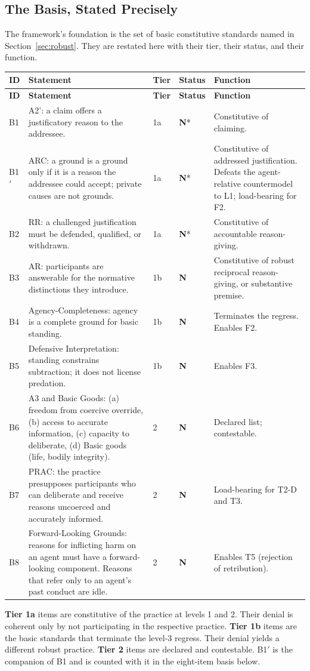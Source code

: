 \documentclass[11pt]{article}
\def\ensuremath#1{#1}%
\def\mathrm#1{#1}%
\def\textsuperscript#1{#1}%
\newcommand{\statusN}{\textcolor{stN}{\textbf{N}}}
\newcommand{\Atwo}{\texorpdfstring{\ensuremath{\mathrm{A2}'}}{A2'}}
\begin{document}
\subsection{The Basis, Stated Precisely}
The framework's foundation is the set of basic constitutive standards named in Section~\ref{sec:robust}. They are restated here with their tier, their status, and their function.
\begin{longtable}{@{}L{1.0cm} L{4.9cm} L{0.9cm} L{1.4cm} L{7.0cm}@{}}
\toprule
\textbf{ID} & \textbf{Statement} & \textbf{Tier} & \textbf{Status} & \textbf{Function} \\
\midrule
\endfirsthead
\toprule
\textbf{ID} & \textbf{Statement} & \textbf{Tier} & \textbf{Status} & \textbf{Function} \\
\midrule
\endhead
\bottomrule
\endfoot
B1 & \Atwo{}: a claim offers a justificatory reason to the addressee. & 1a & \statusN{}\textsuperscript{*} & Constitutive of claiming. \\
B1$'$ & ARC: a ground is a ground only if it is a reason the addressee could accept; private causes are not grounds. & 1a & \statusN{}\textsuperscript{*} & Constitutive of addressed justification. Defeats the agent-relative countermodel to L1; load-bearing for F2. \\
B2 & RR: a challenged justification must be defended, qualified, or withdrawn. & 1a & \statusN{}\textsuperscript{*} & Constitutive of accountable reason-giving. \\
B3 & AR: participants are answerable for the normative distinctions they introduce. & 1b & \statusN{} & Constitutive of robust reciprocal reason-giving, or substantive premise. \\
B4 & Agency-Completeness: agency is a complete ground for basic standing. & 1b & \statusN{} & Terminates the regress. Enables F2. \\
B5 & Defensive Interpretation: standing constrains subtraction; it does not license predation. & 1b & \statusN{} & Enables F3. \\
B6 & A3 and Basic Goods: (a) freedom from coercive override, (b) access to accurate information, (c) capacity to deliberate, (d) Basic goods (life, bodily integrity). & 2 & \statusN{} & Declared list; contestable. \\
B7 & PRAC: the practice presupposes participants who can deliberate and receive reasons uncoerced and accurately informed. & 2 & \statusN{} & Load-bearing for T2-D and T3. \\
B8 & Forward-Looking Grounds: reasons for inflicting harm on an agent must have a forward-looking component. Reasons that refer only to an agent's past conduct are idle. & 2 & \statusN{} & Enables T5 (rejection of retribution). \\
\end{longtable}
\textbf{Tier 1a} items are constitutive of the practice at levels 1 and 2. Their denial is coherent only by not participating in the respective practice. \textbf{Tier 1b} items are the basic standards that terminate the level-3 regress. Their denial yields a different robust practice. \textbf{Tier 2} items are declared and contestable. B1$'$ is the companion of B1 and is counted with it in the eight-item basis below.
\end{document}
